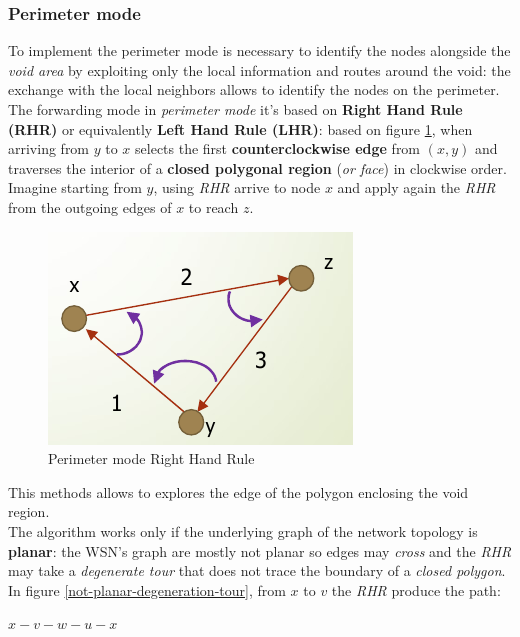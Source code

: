 \documentclass[10pt,a4paper]{report}
\theoremstyle{definition}
\begin{document}
\subsubsection{Perimeter mode}\label{sec:perimeter-mode}
To implement the perimeter mode is necessary to identify the nodes alongside the \textit{void area} by exploiting only the local information and routes around the void: the exchange with the local neighbors allows to identify the nodes on the perimeter.\\
The forwarding mode in \textit{perimeter mode} it's based on \textbf{Right Hand Rule (RHR)} or equivalently \textbf{Left Hand Rule (LHR)}: based on figure \ref{rhr-forwarding}, when arriving from $y$ to $x$ selects the first \textbf{counterclockwise edge} from $(x,y)$ and traverses the interior of a \textbf{closed polygonal region} (\textit{or face}) in clockwise order.
Imagine starting from $y$, using \textit{RHR} arrive to node $x$ and apply again the \textit{RHR} from the outgoing edges of $x$ to reach $z$.
\begin{figure}[h]
	\centering\includegraphics[scale=0.50]{images/Pasted image 20230523151747.png}
	\caption{Perimeter mode Right Hand Rule}
	\label{rhr-forwarding}
\end{figure}

This methods allows to explores the edge of the polygon enclosing the void region.\\
The algorithm works only if the underlying graph of the network topology is \textbf{planar}: the WSN's graph are mostly not planar so edges may \textit{cross} and the \textit{RHR} may take a \textit{degenerate tour} that does not trace the boundary of a \textit{closed polygon}.\\
In figure \ref{not-planar-degeneration-tour}, from $x$ to $v$ the \textit{RHR} produce the path:
\begin{center}
	$x-v-w-u-x$
\end{center}
\end{document}
